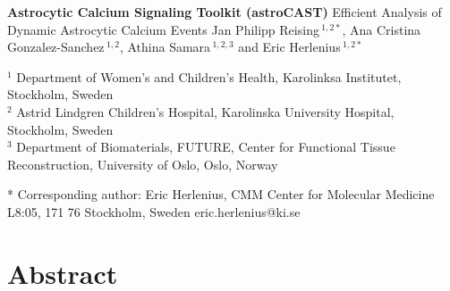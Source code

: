 \documentclass{article}
\begin{document}
    \onecolumn

    \begin{titlepage}
        \begin{center}
            \vspace*{1cm}
            \huge
            \textbf{Astrocytic Calcium Signaling Toolkit (astroCAST)}
            \newline
            \vspace{0.5cm}
            \Large
            Efficient Analysis of Dynamic Astrocytic Calcium Events
            \newline
            \newline
            Jan Philipp Reising\,$^{1,2*}$, Ana Cristina Gonzalez-Sanchez\,$^{1,2}$, Athina Samara\,$^{1,2,3}$ and Eric Herlenius\,$^{1,2*}$
        \end{center}

        $^{1}$ Department of Women's and Children's Health, Karolinksa Institutet, Stockholm, Sweden \\
        $^{2}$ Astrid Lindgren Children’s Hospital, Karolinska University Hospital, Stockholm, Sweden \\
        $^{3}$ Department of Biomaterials, FUTURE, Center for Functional Tissue Reconstruction, University of Oslo, Oslo, Norway

        \newline
        * Corresponding author: \newline
        Eric Herlenius, CMM Center for Molecular Medicine L8:05, 171 76 Stockholm, Sweden\newline
        eric.herlenius@ki.se

        \section*{Abstract}
        

    \end{titlepage}


    \begin{acronym}
    \end{acronym}
\end{document}
